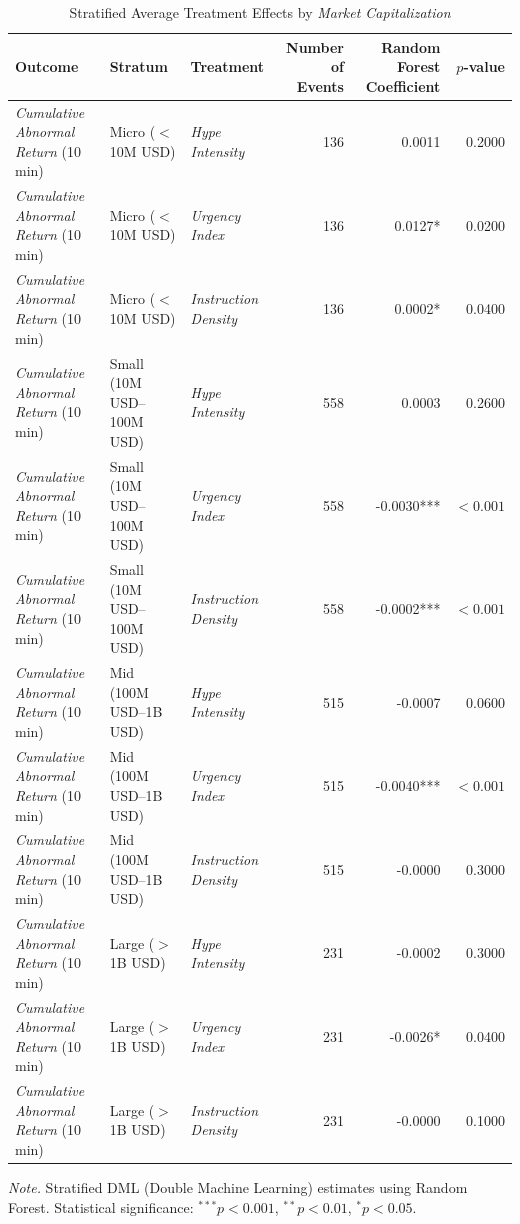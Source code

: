\begin{table}[htbp]
    \centering
    \caption{Stratified Average Treatment Effects by \textit{Market Capitalization}}
    \label{tab:stratified_ate}
    \small
    \begin{tabular}{l l l r r r}
    \toprule
    Outcome & Stratum & Treatment & Number of Events & Random Forest Coefficient & $p$-value \\
    \midrule
    \textit{Cumulative Abnormal Return} (10 min) & Micro ($<$10M USD) & \textit{Hype Intensity} & 136 & 0.0011 & 0.2000 \\
\textit{Cumulative Abnormal Return} (10 min) & Micro ($<$10M USD) & \textit{Urgency Index} & 136 & 0.0127* & 0.0200 \\
\textit{Cumulative Abnormal Return} (10 min) & Micro ($<$10M USD) & \textit{Instruction Density} & 136 & 0.0002* & 0.0400 \\
\textit{Cumulative Abnormal Return} (10 min) & Small (10M USD--100M USD) & \textit{Hype Intensity} & 558 & 0.0003 & 0.2600 \\
\textit{Cumulative Abnormal Return} (10 min) & Small (10M USD--100M USD) & \textit{Urgency Index} & 558 & -0.0030*** & $<0.001$ \\
\textit{Cumulative Abnormal Return} (10 min) & Small (10M USD--100M USD) & \textit{Instruction Density} & 558 & -0.0002*** & $<0.001$ \\
\textit{Cumulative Abnormal Return} (10 min) & Mid (100M USD--1B USD) & \textit{Hype Intensity} & 515 & -0.0007 & 0.0600 \\
\textit{Cumulative Abnormal Return} (10 min) & Mid (100M USD--1B USD) & \textit{Urgency Index} & 515 & -0.0040*** & $<0.001$ \\
\textit{Cumulative Abnormal Return} (10 min) & Mid (100M USD--1B USD) & \textit{Instruction Density} & 515 & -0.0000 & 0.3000 \\
\textit{Cumulative Abnormal Return} (10 min) & Large ($>$1B USD) & \textit{Hype Intensity} & 231 & -0.0002 & 0.3000 \\
\textit{Cumulative Abnormal Return} (10 min) & Large ($>$1B USD) & \textit{Urgency Index} & 231 & -0.0026* & 0.0400 \\
\textit{Cumulative Abnormal Return} (10 min) & Large ($>$1B USD) & \textit{Instruction Density} & 231 & -0.0000 & 0.1000 \\
\bottomrule
    \end{tabular}
    \vspace{2mm}
    \footnotesize
    \textit{Note.} Stratified DML (Double Machine Learning) estimates using Random Forest. 
    Statistical significance: $^{***}p<0.001$, $^{**}p<0.01$, $^{*}p<0.05$.
    \end{table}

